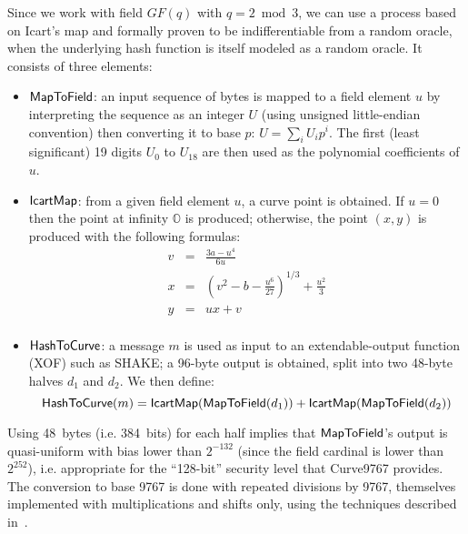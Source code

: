 \documentclass{llncs}
\newcommand{\GF}{GF}
\newcommand{\neutral}{\mathbb{O}}
\begin{document}
Since we work with field $\GF(q)$ with $q = 2\bmod 3$, we can use a
process based on Icart's map\cite{Ica2009} and formally
proven\cite{BriCorIcaMadRanTib2010} to be indifferentiable from a random
oracle, when the underlying hash function is itself modeled as a random
oracle. It consists of three elements:
\begin{itemize}

    \item $\text{\textsf{MapToField}}$: an input sequence of bytes is
    mapped to a field element $u$ by interpreting the sequence as an
    integer $U$ (using unsigned little-endian convention) then
    converting it to base $p$: $U = \sum_i U_i p^i$. The first (least
    significant) 19 digits $U_0$ to $U_{18}$ are then used as the
    polynomial coefficients of $u$.

    \item $\text{\textsf{IcartMap}}$: from a given field element $u$,
    a curve point is obtained. If $u = 0$ then the point at infinity
    $\neutral$ is produced; otherwise, the point $(x,y)$ is produced
    with the following formulas:
    \begin{eqnarray*}
        v &=& \frac{3a - u^4}{6u} \\
        x &=& \left( v^2 - b - \frac{u^6}{27} \right)^{1/3} + \frac{u^2}{3} \\
        y &=& ux + v \\
    \end{eqnarray*}

    \item $\text{\textsf{HashToCurve}}$: a message $m$ is used as
    input to an extendable-output function (XOF) such as
    SHAKE\cite{Fips202}; a 96-byte output is obtained, split into two
    48-byte halves $d_1$ and $d_2$. We then define:
    \begin{equation*}
        \text{\textsf{HashToCurve}}(m) =
            \text{\textsf{IcartMap}}(\text{\textsf{MapToField}}(d_1))
            + \text{\textsf{IcartMap}}(\text{\textsf{MapToField}}(d_2))
    \end{equation*}

\end{itemize}

Using 48~bytes (i.e. 384~bits) for each half implies that
$\text{\textsf{MapToField}}$'s output is quasi-uniform with bias lower
than $2^{-132}$ (since the field cardinal is lower than $2^{252}$), i.e.
appropriate for the ``128-bit'' security level that Curve9767 provides.
The conversion to base 9767 is done with repeated divisions by 9767,
themselves implemented with multiplications and shifts only, using the
techniques described in~\cite{GraMon1994}.
\end{document}

